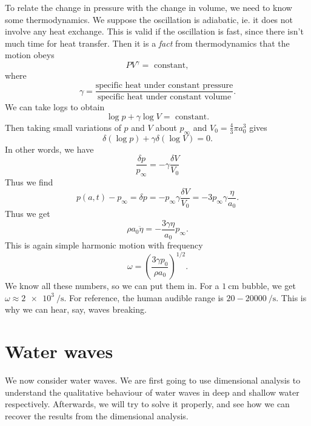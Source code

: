 \documentclass[a4paper]{article}
\begin{document}
\begin{eg}
  To relate the change in pressure with the change in volume, we need to know some thermodynamics. We suppose the oscillation is adiabatic, ie. it does not involve any heat exchange. This is valid if the oscillation is fast, since there isn't much time for heat transfer. Then it is a \emph{fact} from thermodynamics that the motion obeys
  \[
    PV^\gamma =\text{ constant},
  \]
  where
  \[
    \gamma = \frac{\text{specific heat under constant pressure}}{\text{specific heat under constant volume}}.
  \]
  We can take logs to obtain
  \[
    \log p + \gamma \log V = \text{ constant}.
  \]
  Then taking small variations of $p$ and $V$ about $p_\infty$ and $V_0 = \frac{4}{3} \pi a_0^3$ gives
  \[
    \delta (\log p) + \gamma \delta(\log V) = 0.
  \]
  In other words, we have
  \[
    \frac{\delta p}{p_\infty} = -\gamma \frac{\delta V}{V_0}
  \]
  Thus we find
  \[
    p(a, t) - p_\infty = \delta p = -p_\infty \gamma \frac{\delta V}{V_0} = -3p_\infty\gamma \frac{\eta}{a_0}.
  \]
  Thus we get
  \[
    \rho a_0 \ddot{\eta} = -\frac{3 \gamma \eta}{a_0} p_\infty.
  \]
  This is again simple harmonic motion with frequency
  \[
    \omega = \left(\frac{3\gamma p_0}{\rho a_0}\right)^{1/2}.
  \]
  We know all these numbers, so we can put them in. For a $\SI{1}{\centi\meter}$ bubble, we get $\omega \approx \SI{2e3}{\per\second}$. For reference, the human audible range is $20 - \SI{20000}{\per\second}$. This is why we can hear, say, waves breaking.
\end{eg}

\section{Water waves}
We now consider water waves. We are first going to use dimensional analysis to understand the qualitative behaviour of water waves in deep and shallow water respectively. Afterwards, we will try to solve it properly, and see how we can recover the results from the dimensional analysis.
\begin{center}
\end{center}
\end{document}
